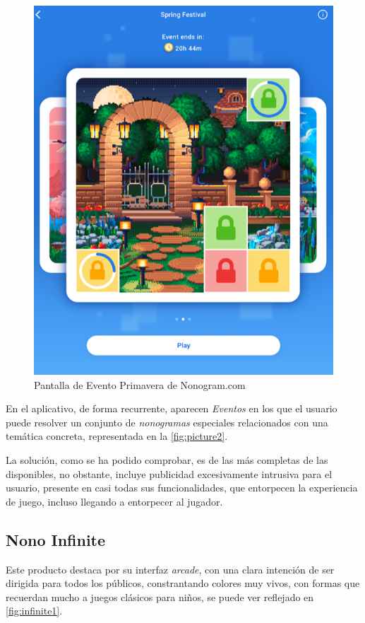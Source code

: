 \begin{figure}[H]
   \centering
   \includegraphics[scale=.25]{images/picturecross3.png}
   \caption{Pantalla de Evento Primavera de Nonogram.com}
   \label{fig:picture2}
 \end{figure}

En el aplicativo, de forma recurrente, aparecen \textit{Eventos} en los que el usuario puede resolver un conjunto de \textit{nonogramas} especiales relacionados
con una temática concreta, representada en la \autoref{fig:picture2}.
 
La solución, como se ha podido comprobar, es de las más completas de las disponibles, no obstante, incluye publicidad excesivamente intrusiva para el usuario,
presente en casi todas sus funcionalidades, que entorpecen la experiencia de juego, incluso llegando a entorpecer al jugador.

\subsection{Nono Infinite}
Este producto destaca por su interfaz \textit{arcade}, con una clara intención de ser dirigida para todos los públicos, constrantando colores muy vivos,
con formas que recuerdan mucho a juegos clásicos para niños, se puede ver reflejado en \autoref{fig:infinite1}.

